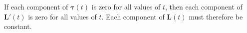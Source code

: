 \item If each component of $\mathbf{\tau}(t)$ is zero for all values of $t$, then each component of $\mathbf{L}'(t)$ is zero for all values of $t$. Each component of $\mathbf{L}(t)$ must therefore be constant. 
\EEN
%
%
%
%
